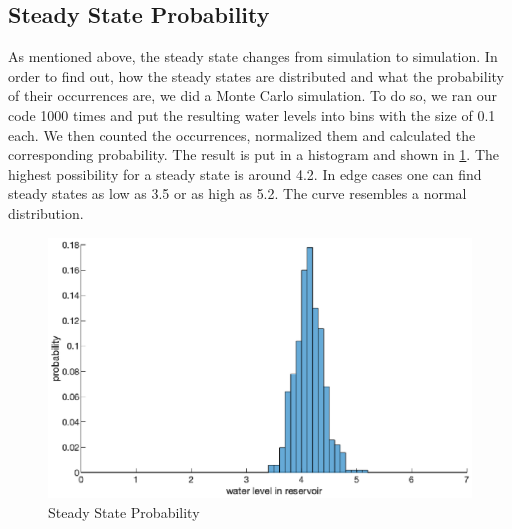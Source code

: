 \documentclass[12pt, a4paper, oneside]{article}
\begin{document}
\subsection{Steady State Probability}
As mentioned above, the steady state changes from simulation to simulation.
In order to find out, how the steady states are distributed and what the probability of their occurrences are, we did a Monte Carlo simulation.
To do so, we ran our code 1000 times and put the resulting water levels into bins with the size of 0.1 each.
We then counted the occurrences, normalized them and calculated the corresponding probability.
The result is put in a histogram and shown in \ref{fig:steadyStateMonteCarlo}.
The highest possibility for a steady state is around 4.2. 
In edge cases one can find steady states as low as 3.5 or as high as 5.2. 
The curve resembles a normal distribution. 

\begin{figure}[ht]
	\includegraphics[width=1\textwidth]{figures/steadyStateMonteCarlo.eps}
	\caption{Steady State Probability}
	\label{fig:steadyStateMonteCarlo}
\end{figure}
\end{document}
